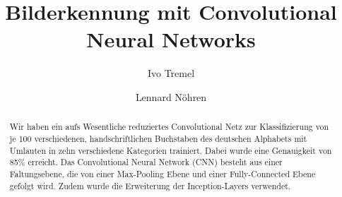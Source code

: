 \documentclass[runningheads,a4paper]{llncs}[2015/06/24]
\begin{document}
\title{Bilderkennung mit Convolutional Neural Networks}

\author{Ivo Tremel \and Lennard Nöhren}

%

			
\maketitle

\begin{abstract}
Wir haben ein aufs Wesentliche reduziertes Convolutional Netz zur Klassifizierung von je 100  verschiedenen, handschriftlichen Buchstaben des deutschen Alphabets mit Umlauten
in zehn verschiedene Kategorien trainiert. Dabei wurde eine Genauigkeit von 85\% erreicht. Das Convolutional Neural Network (CNN) besteht aus einer Faltungsebene, die von einer Max-Pooling Ebene und einer Fully-Connected Ebene gefolgt wird. Zudem wurde die Erweiterung der Inception-Layers verwendet.
\end{abstract}


\end{document}
